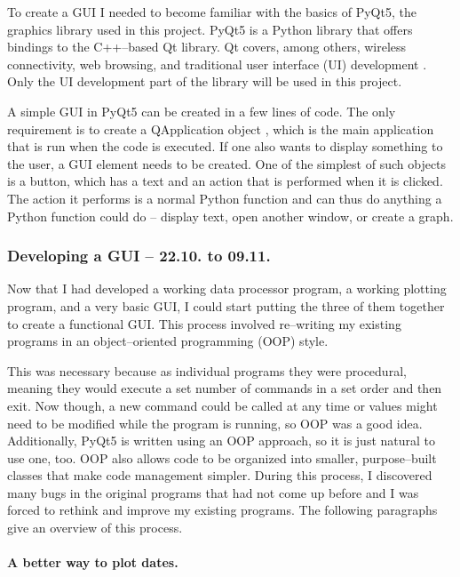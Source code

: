 \documentclass[../00_main.tex]{subfiles}
\begin{document}
To create a GUI I needed to become familiar with the basics of PyQt5, the 
graphics library used in this project. PyQt5 is a Python library that offers 
bindings to the C++--based Qt library. Qt covers, among others, wireless 
connectivity, web browsing, and traditional user interface (UI) development
\cite{pyqt}. Only the UI development part of the library will be used in this 
project.\newline

A simple GUI in PyQt5 can be created in a few lines of code. The only 
requirement is to create a QApplication object \cite{pyqt-ref}, which is the 
main application that is run when the code is executed. If one also wants to 
display something to the user, a GUI element needs to be created. One of the 
simplest of such objects is a button, which has a text and an action that is 
performed when it is clicked. The action it performs is a normal Python 
function and can thus do anything a Python function could do -- display text, 
open another window, or create a graph.

\subsubsection{Developing a GUI -- 22.10. to 09.11.}

Now that I had developed a working data processor program, a working plotting 
program, and a very basic GUI, I could start putting the three of them together 
to create a functional GUI. This process involved re--writing my existing 
programs in an object--oriented programming (OOP) style.\newline

This was necessary because as individual programs they were procedural, meaning 
they would execute a set number of commands in a set order and then exit. Now 
though, a new command could be called at any time or values might need to be 
modified while the program is running, so OOP was a good idea. Additionally, 
PyQt5 is written using an OOP approach, so it is just natural to use one, too. 
OOP also allows code to be organized into smaller, purpose--built classes that 
make code management simpler. During this process, I discovered many bugs in 
the original programs that had not come up before and I was forced to rethink 
and improve my existing programs. The following paragraphs give an overview of 
this process.

\paragraph{A better way to plot dates.} 
\end{document}
